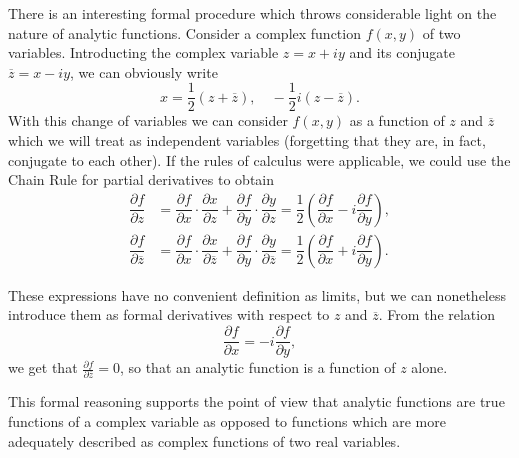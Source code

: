 There is an interesting formal procedure which throws considerable light on the nature of analytic functions. Consider a complex function $f(x,y)$ of two variables. Introducting the complex variable $z=x+iy$ and its conjugate $\overline{z}=x-iy$, we can obviously write $$x=\dfrac{1}{2}\left(z+\overline{z}\right), \quad -\dfrac{1}{2}i(z-\overline{z}).$$ With this change of variables we can consider $f(x,y)$ as a function of $z$ and $\overline{z}$ which we will treat as independent variables (forgetting that they are, in fact, conjugate to each other). If the rules of calculus were applicable, we could use the Chain Rule for partial derivatives to obtain
\begin{align*}
	\dfrac{\partial f}{\partial z} &=\dfrac{\partial f}{\partial x} \cdot \dfrac{\partial x}{\partial z}+\dfrac{\partial f}{\partial y} \cdot \dfrac{\partial y}{\partial z} =\dfrac{1}{2}\left(\dfrac{\partial f}{\partial x}-i\dfrac{\partial f}{\partial y}\right), \\
	\dfrac{\partial f}{\partial \overline{z}} &=\dfrac{\partial f}{\partial x} \cdot \dfrac{\partial x}{\partial \overline{z}}+\dfrac{\partial f}{\partial y} \cdot \dfrac{\partial y}{\partial \overline{z}} =\dfrac{1}{2}\left(\dfrac{\partial f}{\partial x}+i\dfrac{\partial f}{\partial y}\right).
\end{align*}

These expressions have no convenient definition as limits, but we can nonetheless introduce them as formal derivatives with respect to $z$ and $\overline{z}$. From the relation $$\dfrac{\partial f}{\partial x}=-i\dfrac{\partial f}{\partial y},$$ we get that $\frac{\partial f}{\partial \overline{z}}=0$, so that an analytic function is a function of $z$ alone.

This formal reasoning supports the point of view that analytic functions are true functions of a complex variable as opposed to functions which are more adequately described as complex functions of two real variables.

